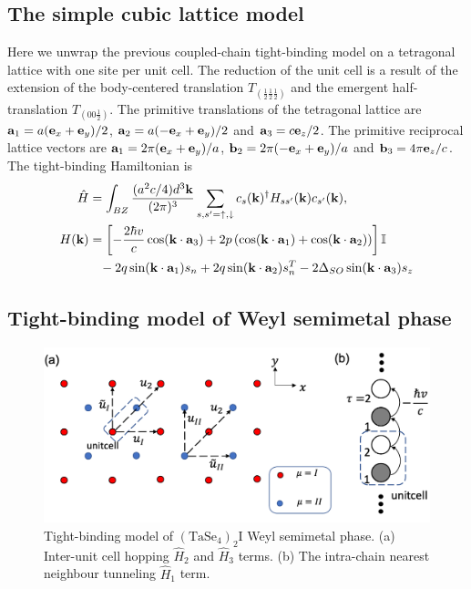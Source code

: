 \subsection{The simple cubic lattice model}
Here we unwrap the previous coupled-chain tight-binding model on a tetragonal lattice with one site per unit cell. The reduction of the unit cell is a result of the extension of the body-centered translation $T_{(\frac{1}{2}\frac{1}{2}\frac{1}{2})}$ and the emergent half-translation $T_{(00\frac{1}{2})}$. The primitive translations of the tetragonal lattice are ${\bf a}_1=a({\bf e}_x+{\bf e}_y)/2$, ${\bf a}_2=a(-{\bf e}_x+{\bf e}_y)/2$ and ${\bf a}_3=c{\bf e}_z/2$. The primitive reciprocal lattice vectors are ${\bf a}_1=2\pi({\bf e}_x+{\bf e}_y)/a$, ${\bf b}_2=2\pi(-{\bf e}_x+{\bf e}_y)/a$ and ${\bf b}_3=4\pi{\bf e}_z/c$. The tight-binding Hamiltonian is \begin{align}\hat{H}&=\int_{BZ}\frac{(a^2c/4)d^3{\bf k}}{(2\pi)^3}\sum_{s,s'=\uparrow,\downarrow}c_s({\bf k})^\dagger H_{ss'}({\bf k})c_{s'}({\bf k})\label{threedimensional} ,\\H({\bf k})&=\left[-\frac{2\hbar v}{c}\cos({\bf k}\cdot{\bf a}_3)+2p\left(\cos({\bf k}\cdot{\bf a}_1)+\cos({\bf k}\cdot{\bf a}_2)\right)\right]\mathbb{I}\nonumber\\&\;\;\;-2q\sin({\bf k}\cdot{\bf a}_1)s_n+2q\sin({\bf k}\cdot{\bf a}_2)s_n^T-2\Delta_{SO}\sin({\bf k}\cdot{\bf a}_3)s_z\nonumber\end{align}



\subsection{Tight-binding model of Weyl semimetal phase}
\begin{figure}[h]
    \centering
    \includegraphics[width=\textwidth]{images/tightbindingWeyl.png}
    \caption{Tight-binding model of $(\mathrm{TaSe}_4)_2\mathrm{I}$ Weyl semimetal phase. (a) Inter-unit cell hopping $\hat{H}_2$ and $\hat{H}_3$ terms. (b) The intra-chain nearest neighbour tunneling $\hat{H}_1$ term.}
    \label{fig:tightbinding}
\end{figure}

